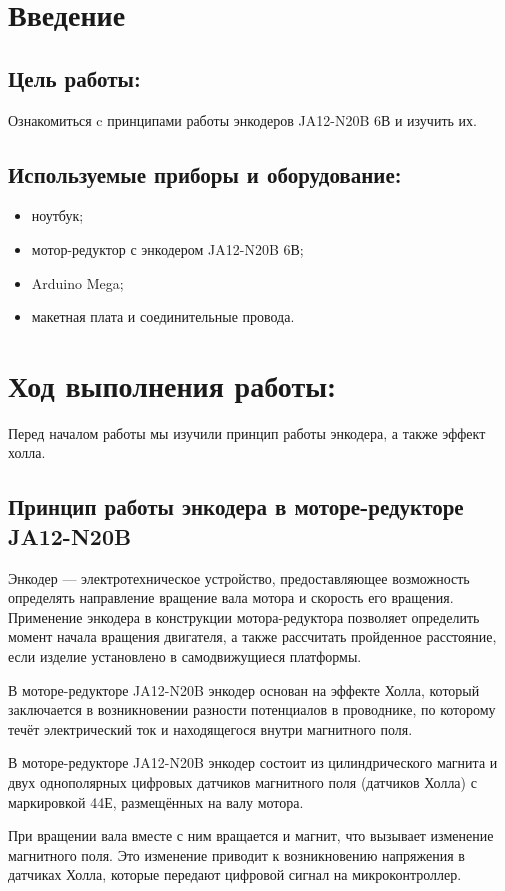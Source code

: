 \section*{Введение}
\subsection*{Цель работы:}
Ознакомиться c принципами работы энкодеров JA12-N20B 6В и изучить их.
\subsection*{Используемые приборы и оборудование:}
\begin{itemize}
    \item ноутбук;
    \item мотор-редуктор с энкодером JA12-N20B 6В;
    \item Arduino Mega;
    \item макетная плата и соединительные провода.
\end{itemize}

\section{Ход выполнения работы:}
Перед началом работы мы изучили принцип работы энкодера, а также эффект холла.

\subsection{Принцип работы энкодера в моторе-редукторе JA12-N20B}
Энкодер --- электротехническое устройство, предоставляющее возможность определять направление вращение вала мотора и скорость его вращения. Применение энкодера в конструкции мотора-редуктора позволяет определить момент начала вращения двигателя, а также рассчитать пройденное расстояние, если изделие установлено в самодвижущиеся платформы.

В моторе-редукторе JA12-N20B энкодер основан на эффекте Холла, который заключается в возникновении разности потенциалов в проводнике, по которому течёт электрический ток и находящегося внутри магнитного поля.

В моторе-редукторе JA12-N20B энкодер состоит из цилиндрического магнита и двух однополярных цифровых датчиков магнитного поля (датчиков Холла) с маркировкой 44Е, размещённых на валу мотора.

При вращении вала вместе с ним вращается и магнит, что вызывает изменение магнитного поля. Это изменение приводит к возникновению напряжения в датчиках Холла, которые передают цифровой сигнал на микроконтроллер.

